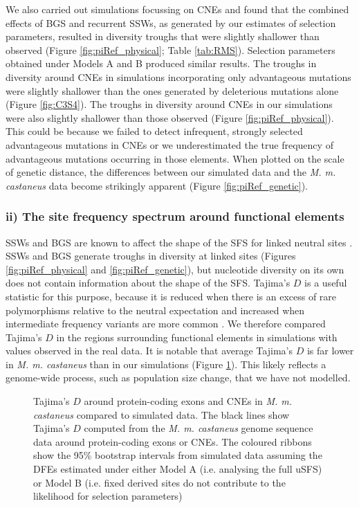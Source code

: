 	We also carried out simulations focussing on CNEs and found that the combined effects of BGS and recurrent SSWs, as generated by our estimates of selection parameters, resulted in diversity troughs that were slightly shallower than observed (Figure \ref{fig:piRef_physical}; Table \ref{tab:RMS}). Selection parameters obtained under Models A and B produced similar results. The troughs in diversity around CNEs in simulations incorporating only advantageous mutations were slightly shallower than the ones generated by deleterious mutations alone (Figure \ref{fig:C3S4}). The troughs in diversity around CNEs in our simulations were also slightly shallower than those observed (Figure \ref{fig:piRef_physical}). This could be because we failed to detect infrequent, strongly selected advantageous mutations in CNEs or we underestimated the true frequency of advantageous mutations occurring in those elements. When plotted on the scale of genetic distance, the differences between our simulated data and the \textit{M. m. castaneus} data become strikingly apparent (Figure \ref{fig:piRef_genetic}). 


\subsubsection{ii) The site frequency spectrum around functional elements}

	SSWs and BGS are known to affect the shape of the SFS for linked neutral sites \citep{RN287, RN234, RN343}. SSWs and BGS generate troughs in diversity at linked sites (Figures \ref{fig:piRef_physical} and \ref{fig:piRef_genetic}), but nucleotide diversity on its own does not contain information about the shape of the SFS. Tajima's $D$ is a useful statistic for this purpose, because it is reduced when there is an excess of rare polymorphisms relative to the neutral expectation and increased when intermediate frequency variants are more common \citep{RN90}. We therefore compared Tajima's $D$ in the regions surrounding functional elements in simulations with values observed in the real data. It is notable that average Tajima's $D$ is far lower in \textit{M. m. castaneus} than in our simulations (Figure \ref{fig:TajimaPlot}). This likely reflects a genome-wide process, such as population size change, that we have not modelled.

 \begin{figure}[H]
   \centering      
   \noindent{}
 \caption[Tajima's $D$ around functional elements in \textit{M. m. castaneus} and simulated populations]{Tajima's $D$ around protein-coding exons and CNEs in \textit{M. m. castaneus} compared to simulated data. The black lines show Tajima's $D$ computed from the \textit{M. m. castaneus} genome sequence data around protein-coding exons or CNEs. The coloured ribbons show the 95\% bootstrap intervals from simulated data assuming the DFEs estimated under either Model A (i.e. analysing the full uSFS) or Model B (i.e. fixed derived sites do not contribute to the likelihood for selection parameters)}
 \label{fig:TajimaPlot}
\end{figure}


